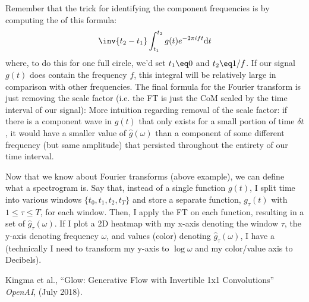 \documentclass[11pt]{article}
\begin{document}
\begin{example}
	
	Remember that the trick for identifying the component frequencies is by computing the  of this formula:
	\begin{align}
	\inv{t_2 - t_1} \int_{t_1}^{t_2} g(t) 	e^{-2\pi i f t} \mathrm{d} t
	\end{align}
	where, to do this for one full circle, we'd set $t_1 \eq 0$ and $t_2 \eq 1/f$. If our signal $g(t)$ does contain the frequency $f$, this integral will be relatively large in comparison with other frequencies. The final formula for the Fourier transform is just removing the scale factor (i.e. the FT is just the CoM scaled by the time interval of our signal):
	More intuition regarding removal of the scale factor: if there is a component wave in $g(t)$ that only exists for a small portion of time $\delta t$, it would have a smaller value of $\hat{g}(\omega)$ than a component of some different frequency (but same amplitude) that persisted throughout the entirety of our time interval.
\end{example}

\begin{example}
	Now that we know about Fourier transforms (above example), we can define what a spectrogram is. Say that, instead of a single function $g(t)$, I split time into various windows $\{t_0, t_1, t_2, t_T\}$ and store a separate function, $g_{\tau}(t)$ with $1 \le \tau \le T$, for each window. Then, I apply the FT on each function, resulting in a set of $\hat{g}_{\tau}(\omega)$. If I plot a 2D heatmap with my x-axis denoting the window $\tau$, the y-axis denoting frequency $\omega$, and values (color) denoting $\hat{g}_{\tau}(\omega)$, I have a  (technically I need to transform my y-axis to $\log \omega$ and my color/value axis to Decibels). 
\end{example}





\vspace{-1em}
{\footnotesize Kingma et al., ``Glow: Generative Flow with Invertible 1x1 Convolutions'' \textit{OpenAI}, (July 2018).}

\newcommand\pt{p_{\theta}}
\end{document}
